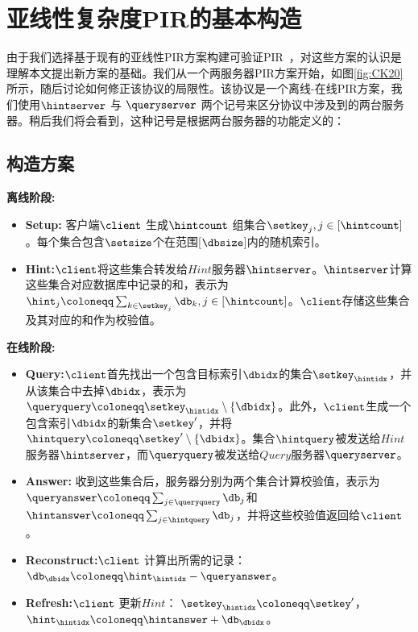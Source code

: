 \section{亚线性复杂度PIR的基本构造}
由于我们选择基于现有的亚线性PIR方案构建可验证PIR~\cite{EC:CorKog20, C:LazPap23}，对这些方案的认识是理解本文提出新方案的基础。我们从一个两服务器PIR方案开始，如图\ref{fig:CK20}所示，随后讨论如何修正该协议的局限性。该协议是一个离线-在线PIR方案，我们使用$\hintserver$ 与 $\queryserver$ 两个记号来区分协议中涉及到的两台服务器。稍后我们将会看到，这种记号是根据两台服务器的功能定义的：

\subsection{构造方案}

\noindent \textbf{离线阶段:}
\begin{itemize}
\item \textbf{Setup:} 客户端$\client$ 生成$\hintcount$ 组集合$\setkey_j, j\in[\hintcount]$。每个集合包含$\setsize$个在范围[$\dbsize$]内的随机索引。
\item \textbf{Hint:}$\client$将这些集合转发给$Hint$服务器$\hintserver$。$\hintserver$计算这些集合对应数据库中记录的和，表示为$\hint_j \coloneqq \sum_{k\in \setkey_j} \db_k, j \in [\hintcount]$。$\client$存储这些集合及其对应的和作为校验值。
\end{itemize}

\textbf{在线阶段:}
\begin{itemize}
\item \textbf{Query:}$\client$首先找出一个包含目标索引$\dbidx$的集合$\setkey_\hintidx$，并从该集合中去掉$\dbidx$，表示为$\queryquery \coloneqq \setkey_\hintidx \setminus \{\dbidx\}$。此外，$\client$生成一个包含索引$\dbidx$的新集合$\setkey'$，并将$\hintquery \coloneqq \setkey' \setminus \{\dbidx\}$。集合$\hintquery$被发送给$Hint$服务器$\hintserver$，而$\queryquery$被发送给$Query$服务器$\queryserver$。
\item \textbf{Answer:} 收到这些集合后，服务器分别为两个集合计算校验值，表示为$\queryanswer\coloneqq \sum_{j\in \queryquery}\db_j$和$\hintanswer\coloneqq \sum_{j\in \hintquery}\db_j$，并将这些校验值返回给$\client$。
\item \textbf{Reconstruct:}$\client$ 计算出所需的记录：$\db_\dbidx \coloneqq \hint_\hintidx - \queryanswer$。
\item \textbf{Refresh:}$\client$ 更新$Hint$： $\setkey_\hintidx \coloneqq \setkey'$，$\hint_\hintidx \coloneqq \hintanswer+\db_\dbidx$。
\end{itemize}


